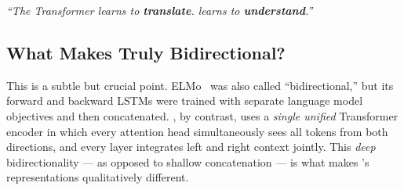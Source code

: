 \begin{remark}
  \textit{``The Transformer learns to \textbf{translate}. \bert{} learns to
  \textbf{understand}.''}
\end{remark}

\subsection{What Makes \bert{} Truly Bidirectional?}

This is a subtle but crucial point. ELMo~\cite{peters2018elmo} was also called
``bidirectional,'' but its forward and backward LSTMs were trained with separate
language model objectives and then concatenated. \bert{}, by contrast, uses a
\emph{single unified} Transformer encoder in which every attention head
simultaneously sees all tokens from both directions, and every layer integrates
left and right context jointly. This \emph{deep} bidirectionality --- as opposed
to shallow concatenation --- is what makes \bert{}'s representations
qualitatively different.